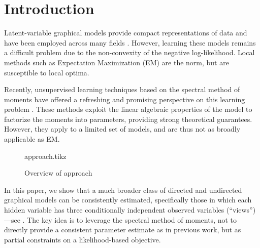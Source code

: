 \section{Introduction}
\label{sec:introduction}

Latent-variable graphical models provide compact representations of data
and have been employed across many fields %
\cite{ghahramani1999variational,jaakkola1999variational,blei03lda,quattoni04crf,beaumont2004bayesian,haghighi06prototype}.
However, learning these models remains a difficult problem due to the
non-convexity of the negative log-likelihood.  Local methods such as Expectation Maximization (EM)
are the norm, but are susceptible to local optima.

Recently, unsupervised learning techniques based on the spectral method of moments
have offered a refreshing and promising perspective on
this learning problem
\citep{mossel2005learning,
hsu09spectral,
bailly2010spectral,
song2011spectral,
anandkumar11tree,anandkumar12moments,anandkumar12lda,
hsu12identifiability,
balle12automata}.
These methods exploit the linear algebraic properties of the model to
factorize the moments into parameters, providing strong theoretical guarantees.
However, they apply to a limited set of models, and are thus
not as broadly applicable as EM.

\begin{figure}[t]
  \label{fig:approach}
  \centering
  {approach.tikz}
  \caption{
  Overview of approach}
\end{figure}


In this paper,
we show that a much broader class of directed and undirected graphical models can be consistently estimated,
specifically those in which each hidden variable has three conditionally
independent observed variables (``views'')---see .
The key idea is to leverage the spectral method of moments,
not to directly provide a consistent parameter estimate as in previous work,
but as partial constraints on a likelihood-based objective.

